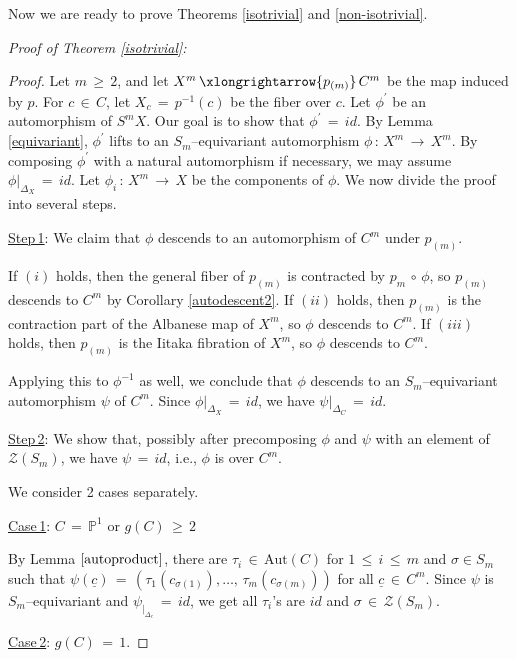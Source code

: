 \documentclass[12pt,reqno]{amsart}
\theoremstyle{definition}
\numberwithin{equation}{section}
\begin{document}
Now we are ready to prove Theorems \ref{isotrivial} and \ref{non-isotrivial}.

\textit{Proof of Theorem \ref{isotrivial}:}
\begin{proof}
Let $m\,\geq\, 2$, and let $X^{m}\,\xlongrightarrow{p_{(m)}}\,C^{m}$ be the map induced by $p$. For $c\,\in \, C$, let $X_{c}\,=\, p^{-1}(c)$ be the fiber over $c$. Let $\phi^{\prime}$ be an automorphism of $S^{m}X$.  Our goal is to show that $\phi^{\prime}\,=\, {id}$.
By Lemma \ref{equivariant}, $\phi^{\prime}$ lifts to an $S_m$--equivariant automorphism $\phi\,:\, X^{m}\,\longrightarrow\, X^{m}$. By composing $\phi^{\prime}$ with a natural automorphism if necessary, we may assume $\phi|_{\Delta_X}\,=\, {id}$. Let $\phi_{i}\,:\, X^{m}\,\longrightarrow\, X$ be the components of $\phi$. We now divide the proof into several steps.


\underline{Step\,1}: We claim that $\phi$ descends to an automorphism of $C^{m}$ under $p_{(m)}$. 

If $(i)$ holds, then the general fiber of $p_{(m)}$ is contracted by $p_{m}\,\circ\, \phi$, so $p_{(m)}$ descends to $C^m$ by Corollary \ref{autodescent2}. If $(ii)$ holds, then $p_{(m)}$ is the contraction part of the Albanese map of $X^m$, so $\phi$ descends to $C^{m}$. If $(iii)$ holds, then $p_{(m)}$ is the Iitaka fibration of $X^m$, so $\phi$ descends to $C^{m}$. 

Applying this to $\phi^{-1}$ as well, we conclude that $\phi$ descends to an $S_m$--equivariant automorphism $\psi$ of $C^{m}$. Since $\phi|_{{\Delta_{X}}}\,=\, {id}$, we have $\psi|_{{\Delta_{C}}}\,=\, {id}$.

\underline{Step\,2}: We show that, possibly after precomposing $\phi$ and $\psi$ with an element of $\mathcal{Z}(S_m)$, we have $\psi\,=\, {id}$, i.e., $\phi$ is over $C^{m}$. 

We consider 2 cases separately.

\underline{Case\,1}: $C\,=\,\mathbb{P}^1$ or $g(C)\,\geq\,2$

By Lemma $\ref{autoproduct}$,  there are $\tau_{i}\,\in\, \textrm{Aut}(C)$ for $1\,\leq\,i\,\leq\,m$ and $\sigma\in S_m$ such that $\psi(\underline{c})\,=\, (\tau_{1}(c_{\sigma(1)}),\ldots,\, \tau_{m}(c_{\sigma(m)}))$ for all $\underline{c}\,\in\, C^{m}$. Since $\psi$ is $S_m$--equivariant and $\psi_{|_{\Delta_{c}}}\,=\,id$, we get all $\tau_i$'s are $id$ and $\sigma\,\in\, \mathcal{Z}(S_m)$. 

\underline{Case\,2}: $g(C)\,=\, 1$. 


\end{proof}
\end{document}
